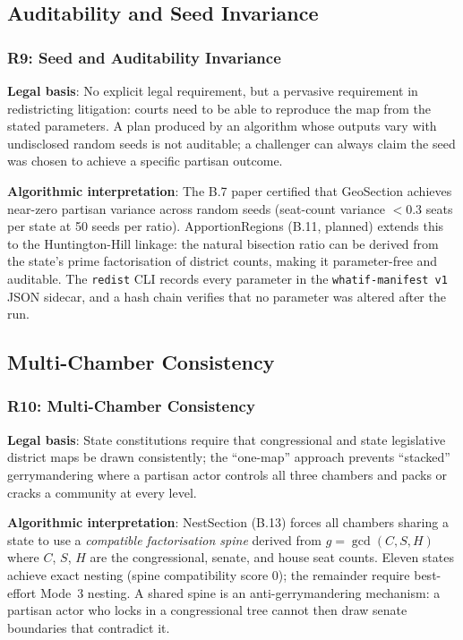 \subsection{Auditability and Seed Invariance}

\subsubsection*{R9: Seed and Auditability Invariance}

\textbf{Legal basis}: No explicit legal requirement, but a pervasive requirement
in redistricting litigation: courts need to be able to reproduce the map from
the stated parameters.
A plan produced by an algorithm whose outputs vary with undisclosed random seeds
is not auditable; a challenger can always claim the seed was chosen to achieve
a specific partisan outcome.

\textbf{Algorithmic interpretation}: The B.7 paper certified that GeoSection
achieves near-zero partisan variance across random seeds (seat-count variance
$< 0.3$ seats per state at 50 seeds per ratio).
ApportionRegions (B.11, planned) extends this to the Huntington-Hill linkage:
the natural bisection ratio can be derived from the state's prime factorisation
of district counts, making it parameter-free and auditable.
The \texttt{redist} CLI records every parameter in the \texttt{whatif-manifest v1}
JSON sidecar, and a hash chain verifies that no parameter was altered after
the run.

\subsection{Multi-Chamber Consistency}

\subsubsection*{R10: Multi-Chamber Consistency}

\textbf{Legal basis}: State constitutions require that congressional and state
legislative district maps be drawn consistently; the ``one-map'' approach prevents
``stacked'' gerrymandering where a partisan actor controls all three chambers and
packs or cracks a community at every level.

\textbf{Algorithmic interpretation}: NestSection (B.13) forces all chambers
sharing a state to use a \emph{compatible factorisation spine} derived from
$g = \gcd(C, S, H)$ where $C$, $S$, $H$ are the congressional, senate, and
house seat counts.
Eleven states achieve exact nesting (spine compatibility score 0); the remainder
require best-effort Mode~3 nesting.
A shared spine is an anti-gerrymandering mechanism: a partisan actor who locks
in a congressional tree cannot then draw senate boundaries that contradict it.


